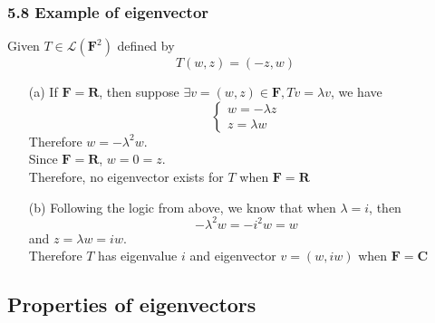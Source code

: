 \documentclass{article}
\begin{document}
\subsubsection*{5.8 Example of eigenvector}
Given $T \in \mathcal{L}(\mathbf{F}^2)$ defined by
\begin{equation*}
    T(w, z) = (-z, w)
\end{equation*}
\begin{itemize}
    \item[(a)] If $\mathbf{F} = \mathbf{R}$, then suppose $\exists v = (w, z) \in \mathbf{F}, Tv = \lambda v$, we have
    \begin{equation*}
        \begin{cases}
            w = - \lambda z \\
            z = \lambda w
        \end{cases} \tag*{5.9}
    \end{equation*}
    Therefore $w = -\lambda^2 w$.\\
    Since $\mathbf{F} = \mathbf{R}$, $w = 0 = z$.\\
    Therefore, no eigenvector exists for $T$ when $\mathbf{F} = \mathbf{R}$
    \item[(b)] Following the logic from above, we know that when $\lambda = i$, then
    \begin{equation*}
        -\lambda^2 w = -i^2 w = w
    \end{equation*}
    and $z = \lambda w = iw$.\\
    Therefore $T$ has eigenvalue $i$ and eigenvector $v = (w, iw)$ when $\mathbf{F} = \mathbf{C}$
\end{itemize}
\subsection*{Properties of eigenvectors}
\end{document}
